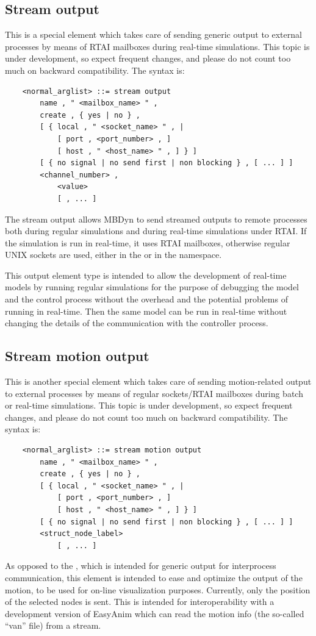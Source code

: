 \subsection{Stream output}\label{sec:EL:BASE:STREAM_OUTPUT}
This is a special element which takes care of sending generic output
to external processes by means of RTAI mailboxes during real-time 
simulations.
This topic is under development, so expect frequent changes, and
please do not count too much on backward compatibility.
The syntax is:
\begin{verbatim}
    <normal_arglist> ::= stream output
        name , " <mailbox_name> " ,
        create , { yes | no } ,
        [ { local , " <socket_name> " , |
            [ port , <port_number> , ]
            [ host , " <host_name> " , ] } ]
        [ { no signal | no send first | non blocking } , [ ... ] ]
        <channel_number> ,
            <value>
            [ , ... ]
\end{verbatim}
The stream output allows MBDyn to send streamed outputs 
to remote processes both during regular simulations and during 
real-time simulations under RTAI.
If the simulation is run in real-time, it uses RTAI mailboxes, 
otherwise regular UNIX sockets are used, either in the  or 
in the  namespace.

This output element type is intended to allow the development 
of real-time models by running regular simulations for the purpose 
of debugging the model and the control process without the overhead 
and the potential problems of running in real-time.
Then the same model can be run in real-time without changing the details
of the communication with the controller process.

\subsection{Stream motion output}\label{sec:EL:BASE:STREAM_MOTION_OUTPUT}
This is another special element which takes care of sending motion-related
output to external processes by means of regular sockets/RTAI mailboxes
during batch or real-time simulations.
This topic is under development, so expect frequent changes, and
please do not count too much on backward compatibility.
The syntax is:
\begin{verbatim}
    <normal_arglist> ::= stream motion output
        name , " <mailbox_name> " ,
        create , { yes | no } ,
        [ { local , " <socket_name> " , |
            [ port , <port_number> , ]
            [ host , " <host_name> " , ] } ]
        [ { no signal | no send first | non blocking } , [ ... ] ]
        <struct_node_label>
            [ , ... ]
\end{verbatim}
As opposed to the , which is intended for generic
output for interprocess communication, this element is intended to ease
and optimize the output of the motion, to be used for on-line visualization
purposes.
Currently, only the position of the selected nodes is sent.
This is intended for interoperability with a development version
of EasyAnim which can read the motion info (the so-called ``van'' file)
from a stream.

